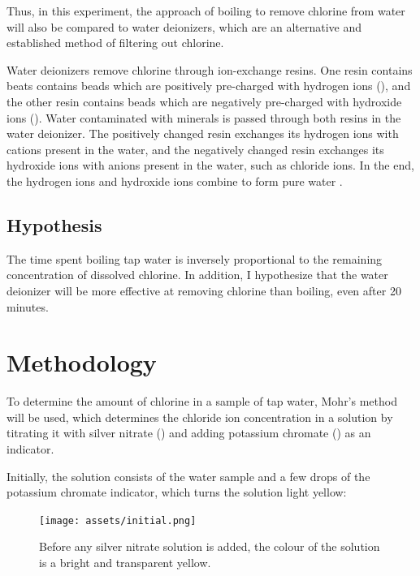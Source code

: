 \documentclass[11pt]{article}
\begin{document}
Thus, in this experiment, the approach of boiling to remove chlorine from water will also be compared to water deionizers, which are an alternative and established method of filtering out chlorine.

Water deionizers remove chlorine through ion-exchange resins. One resin contains beats contains beads which are positively pre-charged with hydrogen ions (), and the other resin contains beads which are negatively pre-charged with hydroxide ions (). Water contaminated with minerals is passed through both resins in the water deionizer. The positively changed resin exchanges its hydrogen ions with cations present in the water, and the negatively changed resin exchanges its hydroxide ions with anions present in the water, such as chloride ions. In the end, the hydrogen ions and hydroxide ions combine to form pure water .


\subsection{Hypothesis}
The time spent boiling tap water is inversely proportional to the remaining concentration of dissolved chlorine. In addition, I hypothesize that the water deionizer will be more effective at removing chlorine than boiling, even after 20 minutes.

\newpage

\section{Methodology}

To determine the amount of chlorine in a sample of tap water, Mohr's method will be used, which determines the chloride ion concentration in a solution by titrating it with silver nitrate () and adding potassium chromate () as an indicator.

Initially, the solution consists of the water sample and a few drops of the potassium chromate indicator, which turns the solution light yellow:

\begin{figure}[H]
	\centering
	\texttt{[image: assets/initial.png]}
	\caption{Before any silver nitrate solution is added, the colour of the solution is a bright and transparent yellow.}
\end{figure}
\end{document}
